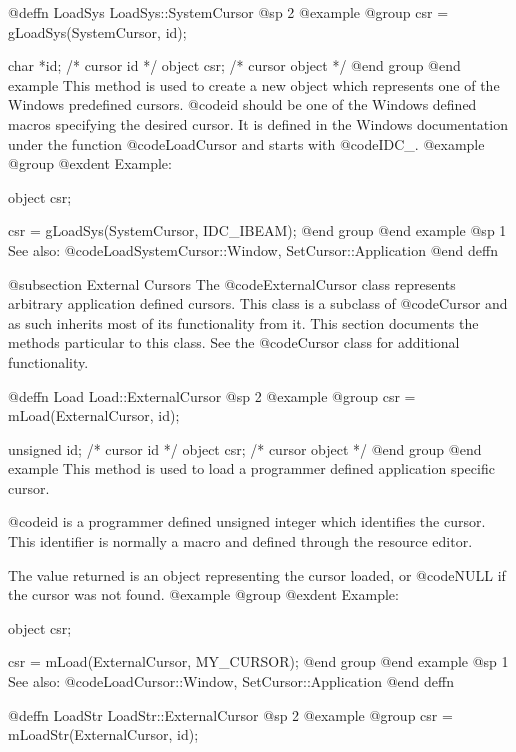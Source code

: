 @deffn {LoadSys} LoadSys::SystemCursor
@sp 2
@example
@group
csr = gLoadSys(SystemCursor, id);

char    *id;    /*  cursor id      */
object  csr;    /*  cursor object  */
@end group
@end example
This method is used to create a new object which represents one of the
Windows predefined cursors.  @code{id} should be one of the Windows
defined macros specifying the desired cursor.  It is defined in the
Windows documentation under the function @code{LoadCursor} and
starts with @code{IDC_}.
@example
@group
@exdent Example:

object  csr;

csr = gLoadSys(SystemCursor, IDC_IBEAM);
@end group
@end example
@sp 1
See also:  @code{LoadSystemCursor::Window, SetCursor::Application}
@end deffn





@subsection External Cursors
The @code{ExternalCursor} class represents arbitrary application defined
cursors.  This class is a subclass of @code{Cursor} and as such inherits
most of its functionality from it.  This section documents the methods
particular to this class.  See the @code{Cursor} class for additional
functionality.






@deffn {Load} Load::ExternalCursor
@sp 2
@example
@group
csr = mLoad(ExternalCursor, id);

unsigned id;    /*  cursor id      */
object   csr;   /*  cursor object  */
@end group
@end example
This method is used to load a programmer defined application specific
cursor.

@code{id} is a programmer defined unsigned integer which identifies
the cursor.  This identifier is normally a macro and defined through the
resource editor.  

The value returned is an object representing the cursor loaded, or
@code{NULL} if the cursor was not found.
@example
@group
@exdent Example:

object  csr;

csr = mLoad(ExternalCursor, MY_CURSOR);
@end group
@end example
@sp 1
See also:  @code{LoadCursor::Window, SetCursor::Application}
@end deffn











@deffn {LoadStr} LoadStr::ExternalCursor
@sp 2
@example
@group
csr = mLoadStr(ExternalCursor, id);

